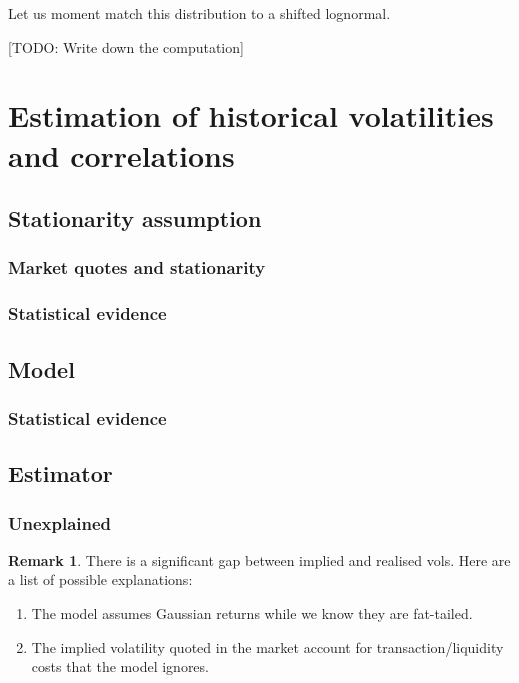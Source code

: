 \documentclass[11pt,english]{amsart}
\theoremstyle{definition}
\newtheorem{rema}{Remark}
\begin{document}
Let us moment match this distribution to a shifted lognormal.

[TODO: Write down the computation]



\newpage%
\section{Estimation of historical volatilities and correlations}%




\subsection{Stationarity assumption}%

\subsubsection{Market quotes and stationarity}


\subsubsection{Statistical evidence}

\subsection{Model}%

\subsubsection{Statistical evidence}


\subsection{Estimator}%



\subsubsection{Unexplained}%

\begin{rema}
There is a significant gap between implied and realised vols. Here are a list of possible explanations:
\begin{enumerate}
\item The model assumes Gaussian returns while we know they are fat-tailed. 
\item The implied volatility quoted in the market account for transaction/liquidity costs that the model ignores.  
\end{enumerate}
\end{rema}
\end{document}
